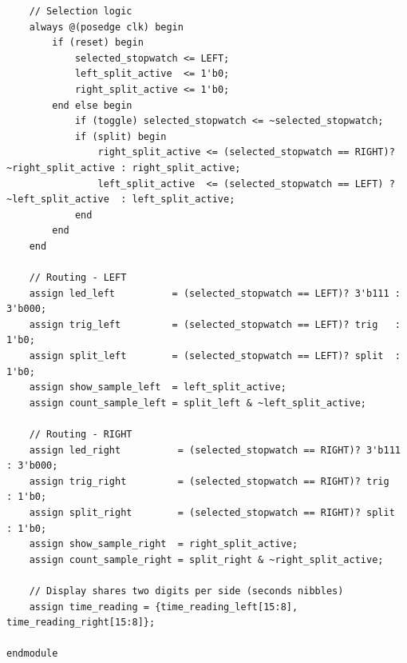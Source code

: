 \documentclass[11pt,a4paper]{article}
\begin{document}
\begin{lstlisting}
    // Selection logic
    always @(posedge clk) begin
        if (reset) begin
            selected_stopwatch <= LEFT;
            left_split_active  <= 1'b0;
            right_split_active <= 1'b0;
        end else begin
            if (toggle) selected_stopwatch <= ~selected_stopwatch;
            if (split) begin
                right_split_active <= (selected_stopwatch == RIGHT)? ~right_split_active : right_split_active;
                left_split_active  <= (selected_stopwatch == LEFT) ? ~left_split_active  : left_split_active;
            end
        end
    end

    // Routing - LEFT
    assign led_left          = (selected_stopwatch == LEFT)? 3'b111 : 3'b000;
    assign trig_left         = (selected_stopwatch == LEFT)? trig   : 1'b0;
    assign split_left        = (selected_stopwatch == LEFT)? split  : 1'b0;
    assign show_sample_left  = left_split_active;
    assign count_sample_left = split_left & ~left_split_active;

    // Routing - RIGHT
    assign led_right          = (selected_stopwatch == RIGHT)? 3'b111 : 3'b000;
    assign trig_right         = (selected_stopwatch == RIGHT)? trig   : 1'b0;
    assign split_right        = (selected_stopwatch == RIGHT)? split  : 1'b0;
    assign show_sample_right  = right_split_active;
    assign count_sample_right = split_right & ~right_split_active;

    // Display shares two digits per side (seconds nibbles)
    assign time_reading = {time_reading_left[15:8], time_reading_right[15:8]};

endmodule
\end{lstlisting}
\end{document}
